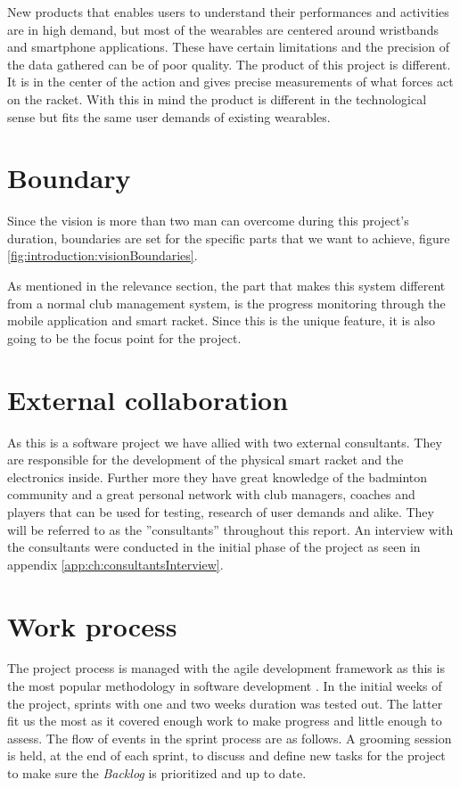 New products that enables users to understand their performances and activities are in high demand, but most of the wearables are centered around wristbands and smartphone applications.
These have certain limitations and the precision of the data gathered can be of poor quality.
The product of this project is different.
It is in the center of the action and gives precise measurements of what forces act on the racket.
With this in mind the product is different in the technological sense but fits the same user demands of existing wearables.

\section{Boundary}
Since the vision is more than two man can overcome during this project's duration, boundaries are set for the specific parts that we want to achieve, figure \ref{fig:introduction:visionBoundaries}.

As mentioned in the relevance section, the part that makes this system different from a normal club management system, is the progress monitoring through the mobile application and smart racket.
Since this is the unique feature, it is also going to be the focus point for the project.


\section{External collaboration}
\label{sec:externalCollaboration}
As this is a software project we have allied with two external consultants.
They are responsible for the development of the physical smart racket and the electronics inside.
Further more they have great knowledge of the badminton community and a great personal network with club managers, coaches and players that can be used for testing, research of user demands and alike.
They will be referred to as the ''consultants'' throughout this report.
An interview with the consultants were conducted in the initial phase of the project as seen in appendix \ref{app:ch:consultantsInterview}.

\section{Work process}
The project process is managed with the agile  development framework as this is the most popular methodology in software development \citep{introduction:work:scrum}. 
In the initial weeks of the project, sprints with one and two weeks duration was tested out.
The latter fit us the most as it covered enough work to make progress and little enough to assess.
The flow of events in the sprint process are as follows.
A grooming session is held, at the end of each sprint, to discuss and define new tasks for the project to make sure the \textit{Backlog} is prioritized and up to date.


